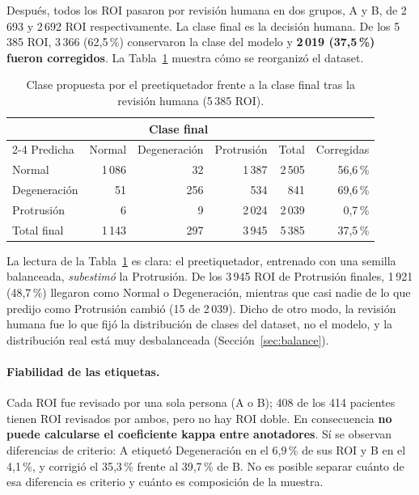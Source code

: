 Después, todos los ROI pasaron por revisión humana en dos grupos, A y B, de 2\,693 y 2\,692 ROI respectivamente. La clase final es la decisión humana. De los 5\,385 ROI, 3\,366 (62,5\,\%) conservaron la clase del modelo y \textbf{2\,019 (37,5\,\%) fueron corregidos}. La Tabla~\ref{tab:reetiquetado} muestra cómo se reorganizó el dataset.

\begin{table}[t]
\centering\small
\caption{Clase propuesta por el preetiquetador frente a la clase final tras la revisión humana (5\,385 ROI).}
\label{tab:reetiquetado}
\begin{tabular}{lrrrrr}
\toprule
 & \multicolumn{3}{c}{Clase final} & & \\
\cmidrule(lr){2-4}
Predicha & Normal & Degeneración & Protrusión & Total & Corregidas \\
\midrule
Normal       & 1\,086 & 32  & 1\,387 & 2\,505 & 56,6\,\% \\
Degeneración & 51     & 256 & 534    & 841    & 69,6\,\% \\
Protrusión   & 6      & 9   & 2\,024 & 2\,039 & 0,7\,\% \\
\midrule
Total final  & 1\,143 & 297 & 3\,945 & 5\,385 & 37,5\,\% \\
\bottomrule
\end{tabular}
\end{table}

La lectura de la Tabla~\ref{tab:reetiquetado} es clara: el preetiquetador, entrenado con una semilla balanceada, \emph{subestimó} la Protrusión. De los 3\,945 ROI de Protrusión finales, 1\,921 (48,7\,\%) llegaron como Normal o Degeneración, mientras que casi nadie de lo que predijo como Protrusión cambió (15 de 2\,039). Dicho de otro modo, la revisión humana fue lo que fijó la distribución de clases del dataset, no el modelo, y la distribución real está muy desbalanceada (Sección~\ref{sec:balance}).

\paragraph{Fiabilidad de las etiquetas.} Cada ROI fue revisado por una sola persona (A o B); 408 de los 414 pacientes tienen ROI revisados por ambos, pero no hay ROI doble. En consecuencia \textbf{no puede calcularse el coeficiente kappa entre anotadores}. Sí se observan diferencias de criterio: A etiquetó Degeneración en el 6,9\,\% de sus ROI y B en el 4,1\,\%, y corrigió el 35,3\,\% frente al 39,7\,\% de B. No es posible separar cuánto de esa diferencia es criterio y cuánto es composición de la muestra.

